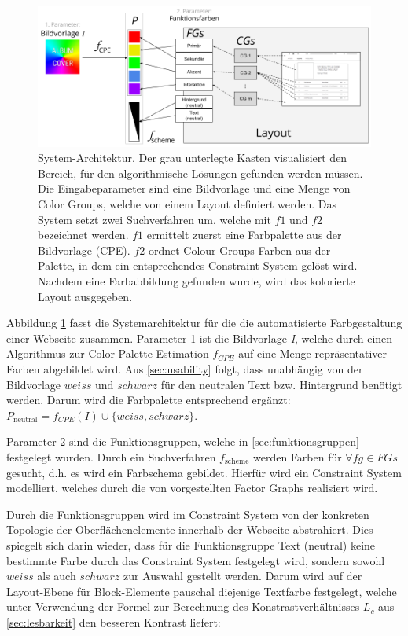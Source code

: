 \begin{figure}
	\centering
	\includegraphics[width=1\textwidth]{img/architecture.png}
	\caption{System-Architektur. Der grau unterlegte Kasten visualisiert den Bereich, für den algorithmische Lösungen gefunden werden müssen. Die Eingabeparameter sind eine Bildvorlage und eine Menge von Color Groups, welche von einem Layout definiert werden. Das System setzt zwei Suchverfahren um, welche mit $f1$ und $f2$ bezeichnet werden. $f1$ ermittelt zuerst eine Farbpalette aus der Bildvorlage (CPE). $f2$ ordnet Colour Groups Farben aus der Palette, in dem ein entsprechendes Constraint System gelöst wird. Nachdem eine Farbabbildung gefunden wurde, wird das kolorierte Layout ausgegeben.}
	\label{fig:architecture}
\end{figure}

Abbildung \ref{fig:architecture} fasst die Systemarchitektur für die die automatisierte Farbgestaltung einer Webseite zusammen. Parameter 1 ist die Bildvorlage \emph{I}, welche durch einen Algorithmus zur Color Palette Estimation $f_{CPE}$ auf eine Menge repräsentativer Farben abgebildet wird. Aus \autoref{sec:usability} folgt, dass unabhängig von der Bildvorlage $weiss$ und $schwarz$ für den neutralen Text bzw. Hintergrund benötigt werden. Darum wird die Farbpalette entsprechend ergänzt: $P_\text{neutral} = f_{CPE}(I) \cup \{weiss, schwarz\}$.

Parameter 2 sind die Funktionsgruppen, welche in \autoref{sec:funktionsgruppen} festgelegt wurden. Durch ein Suchverfahren $f_\text{scheme}$ werden Farben für $\forall fg \in FGs$ gesucht, d.h. es wird ein Farbschema gebildet. Hierfür wird ein Constraint System modelliert, welches durch die von \citet{patterns} vorgestellten Factor Graphs realisiert wird.

Durch die Funktionsgruppen wird im Constraint System von der konkreten Topologie der Oberflächenelemente innerhalb der Webseite abstrahiert. Dies spiegelt sich darin wieder, dass für die Funktionsgruppe \glqq{}Text (neutral)\grqq{} keine bestimmte Farbe durch das Constraint System festgelegt wird, sondern sowohl $weiss$ als auch $schwarz$ zur Auswahl gestellt werden. Darum wird auf der Layout-Ebene für Block-Elemente pauschal diejenige Textfarbe festgelegt, welche unter Verwendung der Formel zur Berechnung des Konstrastverhältnisses $L_c$ aus \autoref{sec:lesbarkeit} den besseren Kontrast liefert:



